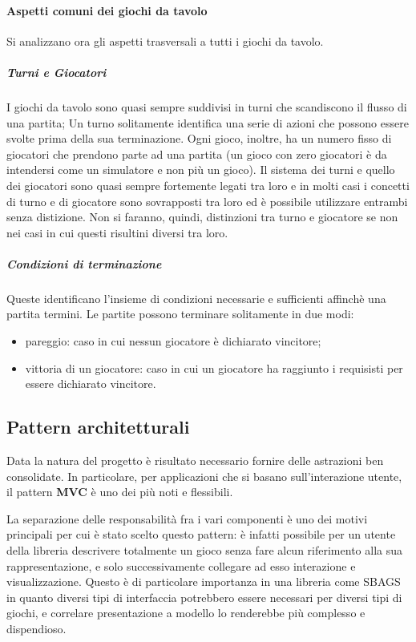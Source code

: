\paragraph{Aspetti comuni dei giochi da tavolo}
%
Si analizzano ora gli aspetti trasversali a tutti i giochi da tavolo.
%
\subparagraph{Turni e Giocatori}
%
I giochi da tavolo sono quasi sempre suddivisi in turni che scandiscono il flusso di una partita; Un turno solitamente identifica una serie di azioni che possono essere svolte prima della sua terminazione.
%
Ogni gioco, inoltre, ha un numero fisso di giocatori che prendono parte ad una partita (un gioco con zero giocatori è da intendersi come un simulatore e non più un gioco).
%
Il sistema dei turni e quello dei giocatori sono quasi sempre fortemente legati tra loro e in molti casi i concetti di turno e di giocatore sono sovrapposti tra loro ed è possibile utilizzare entrambi senza distizione.
%
Non si faranno, quindi, distinzioni tra turno e giocatore se non nei casi in cui questi risultini diversi tra loro.
%
\subparagraph{Condizioni di terminazione}
%
Queste identificano l'insieme di condizioni necessarie e sufficienti affinchè una partita termini.
%
Le partite possono terminare solitamente in due modi:
\begin{itemize}
    \item pareggio: caso in cui nessun giocatore è dichiarato vincitore;
    \item vittoria di un giocatore: caso in cui un giocatore ha raggiunto i requisisti per essere dichiarato vincitore.
\end{itemize}

\subsection{Pattern architetturali}
Data la natura del progetto è risultato necessario fornire delle astrazioni ben consolidate.
%
In particolare, per applicazioni che si basano sull'interazione utente, il pattern \textbf{MVC} è uno dei più noti e flessibili.

La separazione delle responsabilità fra i vari componenti è uno dei motivi principali per cui è stato scelto questo pattern: è infatti possibile per un utente della libreria descrivere totalmente un gioco senza fare alcun riferimento alla sua rappresentazione, e solo successivamente collegare ad esso interazione e visualizzazione.
%
Questo è di particolare importanza in una libreria come SBAGS in quanto diversi tipi di interfaccia potrebbero essere necessari per diversi tipi di giochi, e correlare presentazione a modello lo renderebbe più complesso e dispendioso.

